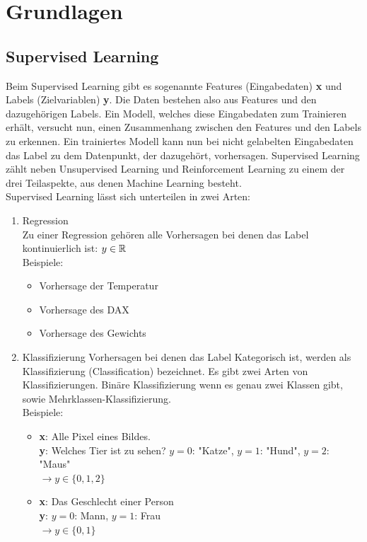 \chapter{Grundlagen}
    \section{Supervised Learning}
        \cite{supervised} Beim Supervised Learning gibt es sogenannte Features (Eingabedaten) \textbf{x}
        und Labels (Zielvariablen) \textbf{y}.
        Die Daten bestehen also aus Features und den dazugehörigen Labels.
        Ein Modell, welches diese Eingabedaten zum Trainieren erhält, versucht nun, einen Zusammenhang zwischen den Features und den Labels zu erkennen.
        Ein trainiertes Modell kann nun bei nicht gelabelten Eingabedaten das Label zu dem Datenpunkt, der dazugehört, vorhersagen.
        Supervised Learning zählt neben Unsupervised Learning und Reinforcement Learning zu einem der drei Teilaspekte, aus denen Machine Learning besteht.\\[2ex]
        Supervised Learning lässt sich unterteilen in zwei Arten:

        \begin{enumerate}
            \item Regression\\
                Zu einer Regression gehören alle Vorhersagen bei denen das Label kontinuierlich ist: $y \in \mathbb{ R}$ \\
                Beispiele:
                \begin{itemize}
                    \item Vorhersage der Temperatur
                    \item Vorhersage des DAX
                    \item Vorhersage des Gewichts
                \end{itemize}
            \item Klassifizierung
                Vorhersagen bei denen das Label  Kategorisch ist, werden als Klassifizierung (Classification) bezeichnet.
                Es gibt zwei Arten von Klassifizierungen. Binäre Klassifizierung wenn es genau zwei Klassen gibt, sowie Mehrklassen-Klassifizierung.\\
                Beispiele:
                \begin{itemize}
                    \item 
                    \textbf{x}: Alle Pixel eines Bildes.\\
                    \textbf{y}: Welches Tier ist zu sehen? $y = 0$: "Katze", $y = 1$: "Hund", $y = 2$: "Maus" \\
                    $\rightarrow y \in \{0, 1, 2\}$
                    \item
                    \textbf{x}: Das Geschlecht einer Person \\
                    \textbf{y}: $y = 0$: Mann, $y = 1$: Frau \\
                    $\rightarrow y \in \{0, 1\}$
                \end{itemize}
        \end{enumerate}

